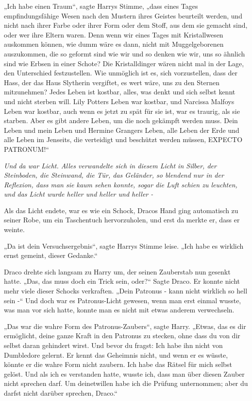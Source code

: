 {„Ich habe einen Traum“, sagte Harrys Stimme, „dass eines Tages empfindungsfähige Wesen nach den Mustern ihres Geistes beurteilt werden, und nicht nach ihrer Farbe oder ihrer Form oder dem Stoff, aus dem sie gemacht sind, oder wer ihre Eltern waren. Denn wenn wir eines Tages mit Kristallwesen auskommen können, wie dumm wäre es dann, nicht mit Muggelgeborenen auszukommen, die so geformt sind wie wir und so denken wie wir, uns so ähnlich sind wie Erbsen in einer Schote? Die Kristalldinger wären nicht mal in der Lage, den Unterschied festzustellen. Wie unmöglich ist es, sich vorzustellen, dass der Hass, der das Haus Slytherin vergiftet, es wert wäre, uns zu den Sternen mitzunehmen? Jedes Leben ist kostbar, alles, was denkt und sich selbst kennt und nicht sterben will. Lily Potters Leben war kostbar, und Narcissa Malfoys Leben war kostbar, auch wenn es jetzt zu spät für sie ist, war es traurig, als sie starben. Aber es gibt andere Leben, um die noch gekämpft werden muss. Dein Leben und mein Leben und Hermine Grangers Leben, alle Leben der Erde und alle Leben im Jenseits, die verteidigt und beschützt werden müssen, EXPECTO PATRONUM!“

\emph{Und da war Licht. Alles verwandelte sich in diesem Licht in Silber, der Steinboden, die Steinwand, die Tür, das Geländer, so blendend nur in der Reflexion, dass man sie kaum sehen konnte, sogar die Luft schien zu leuchten, und das Licht wurde heller und heller und heller -}

Als das Licht endete, war es wie ein Schock, Dracos Hand ging automatisch zu seiner Robe, um ein Taschentuch hervorzuholen, und erst da merkte er, dass er weinte.

„Da ist dein Versuchsergebnis“, sagte Harrys Stimme leise. „Ich habe es wirklich ernst gemeint, dieser Gedanke.“

Draco drehte sich langsam zu Harry um, der seinen Zauberstab nun gesenkt hatte. „Das, das muss doch ein Trick sein, oder?“ Sagte Draco. Er konnte nicht mehr viele dieser Schocks verkraften. „Dein Patronus - kann nicht wirklich so hell sein -“ Und doch war es Patronus-Licht gewesen, wenn man erst einmal wusste, was man vor sich hatte, konnte man es nicht mit etwas anderem verwechseln.

„Das war die wahre Form des Patronus-Zaubers“, sagte Harry. „Etwas, das es dir ermöglicht, deine ganze Kraft in den Patronus zu stecken, ohne dass du von dir selbst daran gehindert wirst. Und bevor du fragst: Ich habe ihn nicht von Dumbledore gelernt. Er kennt das Geheimnis nicht, und wenn er es wüsste, könnte er die wahre Form nicht zaubern. Ich habe das Rätsel für mich selbst gelöst. Und als ich es verstanden hatte, wusste ich, dass man über diesen Zauber nicht sprechen darf. Um deinetwillen habe ich die Prüfung unternommen; aber du darfst nicht darüber sprechen, Draco.“

}
